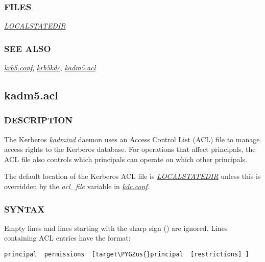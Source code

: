 \documentclass[letterpaper,10pt,english]{sphinxmanual}
\def\PYGZus{\char`\_}
\begin{document}
\subsubsection{FILES}
\label{admin/conf_files/kdc_conf:files}
{\hyperref[mitK5defaults:paths]{\emph{LOCALSTATEDIR}}}


\subsubsection{SEE ALSO}
\label{admin/conf_files/kdc_conf:see-also}
{\hyperref[admin/conf_files/krb5_conf:krb5-conf-5]{\emph{krb5.conf}}}, {\hyperref[admin/admin_commands/krb5kdc:krb5kdc-8]{\emph{krb5kdc}}}, {\hyperref[admin/conf_files/kadm5_acl:kadm5-acl-5]{\emph{kadm5.acl}}}


\subsection{kadm5.acl}
\label{admin/conf_files/kadm5_acl:kadm5-acl}\label{admin/conf_files/kadm5_acl:kadm5-acl-5}\label{admin/conf_files/kadm5_acl::doc}

\subsubsection{DESCRIPTION}
\label{admin/conf_files/kadm5_acl:description}
The Kerberos {\hyperref[admin/admin_commands/kadmind:kadmind-8]{\emph{kadmind}}} daemon uses an Access Control List
(ACL) file to manage access rights to the Kerberos database.
For operations that affect principals, the ACL file also controls
which principals can operate on which other principals.

The default location of the Kerberos ACL file is
{\hyperref[mitK5defaults:paths]{\emph{LOCALSTATEDIR}}}  unless this is overridden by the \emph{acl\_file}
variable in {\hyperref[admin/conf_files/kdc_conf:kdc-conf-5]{\emph{kdc.conf}}}.


\subsubsection{SYNTAX}
\label{admin/conf_files/kadm5_acl:syntax}
Empty lines and lines starting with the sharp sign (\code{\#}) are
ignored.  Lines containing ACL entries have the format:

\begin{Verbatim}[commandchars=\\\{\}]
principal  permissions  [target\PYGZus{}principal  [restrictions] ]
\end{Verbatim}
\end{document}
